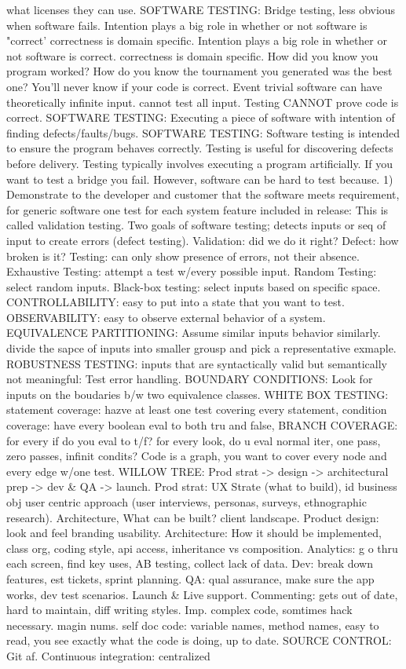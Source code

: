 \documentclass[10pt]{article}
\begin{document}
\begin{landscape}
\begin{multicols*}{6}
what licenses they can use. SOFTWARE TESTING: Bridge testing, less obvious when software fails. Intention plays a big role in whether or not software is "correct' correctness is domain specific. Intention plays a big role in whether or not software is correct. correctness is domain specific. How did you know you program worked? How do you know the tournament you generated was the best one? You'll never know if your code is correct. Event trivial software can have theoretically infinite input. cannot test all input. Testing CANNOT prove code is correct. SOFTWARE TESTING: Executing a piece of software with intention of finding defects/faults/bugs. SOFTWARE TESTING: Software testing is intended to ensure the program behaves correctly. Testing is useful for discovering defects before delivery. Testing typically involves executing a program artificially. If you want to test a bridge you fail. However, software can be hard to test because. 1) Demonstrate to the developer and customer that the software meets requirement, for generic software one test for each system feature included in release: This is called validation testing. Two goals of software testing; detects inputs or seq of input to create errors (defect testing). Validation: did we do it right? Defect: how broken is it? Testing: can only show presence of errors, not their absence. Exhaustive Testing: attempt a test w/every possible input. Random Testing: select random inputs. Black-box testing: select inputs based on specific space. CONTROLLABILITY: easy to put into a state that you want to test. OBSERVABILITY: easy to observe external behavior of a system. EQUIVALENCE PARTITIONING: Assume similar inputs behavior similarly. divide the sapce of inputs into smaller grousp and pick a representative exmaple. ROBUSTNESS TESTING: inputs that are syntactically valid but semantically not meaningful: Test error handling. BOUNDARY CONDITIONS: Look for inputs on the boudaries b/w two equivalence classes. WHITE BOX TESTING: statement coverage: hazve at least one test covering every statement, condition coverage: have every boolean eval to both tru and false, BRANCH COVERAGE: for every if do you eval to t/f? for every look, do u eval normal iter, one pass, zero passes, infinit condits? Code is a graph, you want to cover every node and every edge w/one test. WILLOW TREE: Prod strat -> design -> architectural prep -> dev \& QA -> launch. Prod strat: UX Strate (what to build), id business obj user centric approach (user interviews, personas, surveys, ethnographic research). Architecture, What can be built? client landscape. Product design: look and feel branding usability. Architecture: How it should be implemented, class org, coding style, api access, inheritance vs composition. Analytics: g o thru each screen, find key uses, AB testing, collect lack of data. Dev: break down features, est tickets, sprint planning. QA: qual assurance, make sure the app works, dev test scenarios. Launch \& Live support. Commenting: gets out of date, hard to maintain, diff writing styles. Imp. complex code, somtimes hack necessary. magin nums. self doc code: variable names, method names, easy to read, you see exactly what the code is doing, up to date. SOURCE CONTROL: Git af. Continuous integration: centralized 
\end{multicols*}
\end{landscape}
\end{document}
